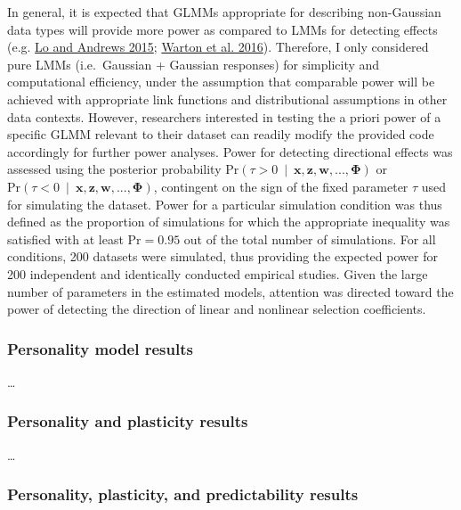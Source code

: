 \documentclass{article}
\begin{document}
In general, it is expected that GLMMs appropriate for describing
non-Gaussian data types will provide more power as compared to LMMs for
detecting effects (e.g. \protect\hyperlink{ref-Lo2015}{Lo and Andrews
2015}; \protect\hyperlink{ref-Warton2016}{Warton et al. 2016}).
Therefore, I only considered pure LMMs (i.e.~Gaussian + Gaussian
responses) for simplicity and computational efficiency, under the
assumption that comparable power will be achieved with appropriate link
functions and distributional assumptions in other data contexts.
However, researchers interested in testing the a priori power of a
specific GLMM relevant to their dataset can readily modify the provided
code accordingly for further power analyses. Power for detecting
directional effects was assessed using the posterior probability
\(\mathrm{Pr}\left( \tau > 0 \ \mid \ \boldsymbol{x},\boldsymbol{z},\boldsymbol{w},...,\boldsymbol{\Phi} \right)\)
or
\(\mathrm{Pr}\left( \tau < 0 \ \mid \ \boldsymbol{x},\boldsymbol{z},\boldsymbol{w},...,\boldsymbol{\Phi} \right)\),
contingent on the sign of the fixed parameter \(\tau\) used for
simulating the dataset. Power for a particular simulation condition was
thus defined as the proportion of simulations for which the appropriate
inequality was satisfied with at least \(\mathrm{Pr} = 0.95\) out of the
total number of simulations. For all conditions, 200 datasets were
simulated, thus providing the expected power for 200 independent and
identically conducted empirical studies. Given the large number of
parameters in the estimated models, attention was directed toward the
power of detecting the direction of linear and nonlinear selection
coefficients.

\hypertarget{personality-model-results}{%
\subsubsection{Personality model
results}\label{personality-model-results}}

\ldots{}

\hypertarget{personality-and-plasticity-results}{%
\subsubsection{Personality and plasticity
results}\label{personality-and-plasticity-results}}

\ldots{}

\hypertarget{personality-plasticity-and-predictability-results}{%
\subsubsection{Personality, plasticity, and predictability
results}\label{personality-plasticity-and-predictability-results}}
\end{document}
